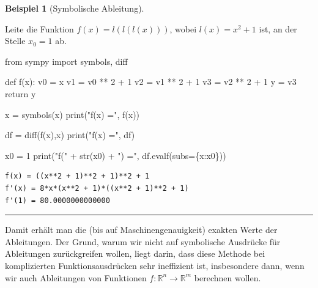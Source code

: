 \documentclass[
  a4paper,
  DIV=11]{scrreprt}
\newenvironment{Shaded}{\begin{snugshade}}{\end{snugshade}}
\newcommand{\BuiltInTok}[1]{\textcolor[rgb]{0.00,0.23,0.31}{#1}}
\newcommand{\ControlFlowTok}[1]{\textcolor[rgb]{0.00,0.23,0.31}{#1}}
\newcommand{\DecValTok}[1]{\textcolor[rgb]{0.68,0.00,0.00}{#1}}
\newcommand{\ImportTok}[1]{\textcolor[rgb]{0.00,0.46,0.62}{#1}}
\newcommand{\KeywordTok}[1]{\textcolor[rgb]{0.00,0.23,0.31}{#1}}
\newcommand{\NormalTok}[1]{\textcolor[rgb]{0.00,0.23,0.31}{#1}}
\newcommand{\OperatorTok}[1]{\textcolor[rgb]{0.37,0.37,0.37}{#1}}
\newcommand{\StringTok}[1]{\textcolor[rgb]{0.13,0.47,0.30}{#1}}
\theoremstyle{definition}
\theoremstyle{definition}
\newtheorem{example}{Beispiel}[chapter]
\theoremstyle{remark}
\begin{document}
\begin{example}[Symbolische
Ableitung]\protect\hypertarget{exm-symbDiff}{}\label{exm-symbDiff}

Leite die Funktion \(f(x) = l(l(l(x)))\), wobei \(l(x) = x^2 + 1\) ist,
an der Stelle \(x_0 = 1\) ab.

\begin{Shaded}
\begin{Highlighting}[]
\ImportTok{from}\NormalTok{ sympy }\ImportTok{import}\NormalTok{ symbols, diff}

\KeywordTok{def}\NormalTok{ f(x):}
\NormalTok{    v0 }\OperatorTok{=}\NormalTok{ x}
\NormalTok{    v1 }\OperatorTok{=}\NormalTok{ v0 }\OperatorTok{**} \DecValTok{2} \OperatorTok{+} \DecValTok{1}
\NormalTok{    v2 }\OperatorTok{=}\NormalTok{ v1 }\OperatorTok{**} \DecValTok{2} \OperatorTok{+} \DecValTok{1}
\NormalTok{    v3 }\OperatorTok{=}\NormalTok{ v2 }\OperatorTok{**} \DecValTok{2} \OperatorTok{+} \DecValTok{1}
\NormalTok{    y }\OperatorTok{=}\NormalTok{ v3}
    \ControlFlowTok{return}\NormalTok{ y}

\NormalTok{x }\OperatorTok{=}\NormalTok{ symbols(}\StringTok{\textquotesingle{}x\textquotesingle{}}\NormalTok{)}
\BuiltInTok{print}\NormalTok{(}\StringTok{"f(x) ="}\NormalTok{, f(x))}

\NormalTok{df }\OperatorTok{=}\NormalTok{ diff(f(x),x)}
\BuiltInTok{print}\NormalTok{(}\StringTok{"f\textquotesingle{}(x) ="}\NormalTok{, df)}

\NormalTok{x0 }\OperatorTok{=} \DecValTok{1}
\BuiltInTok{print}\NormalTok{(}\StringTok{"f\textquotesingle{}("} \OperatorTok{+} \BuiltInTok{str}\NormalTok{(x0) }\OperatorTok{+} \StringTok{") ="}\NormalTok{, df.evalf(subs}\OperatorTok{=}\NormalTok{\{x:x0\}))}
\end{Highlighting}
\end{Shaded}

\begin{verbatim}
f(x) = ((x**2 + 1)**2 + 1)**2 + 1
f'(x) = 8*x*(x**2 + 1)*((x**2 + 1)**2 + 1)
f'(1) = 80.0000000000000
\end{verbatim}

\end{example}

\begin{center}\rule{0.5\linewidth}{0.5pt}\end{center}

Damit erhält man die (bis auf Maschinengenauigkeit) exakten Werte der
Ableitungen. Der Grund, warum wir nicht auf symbolische Ausdrücke für
Ableitungen zurückgreifen wollen, liegt darin, dass diese Methode bei
komplizierten Funktionsausdrücken sehr ineffizient ist, insbesondere
dann, wenn wir auch Ableitungen von Funktionen
\(f : \mathbb{R}^n \rightarrow \mathbb{R}^m\) berechnen wollen.
\end{document}
